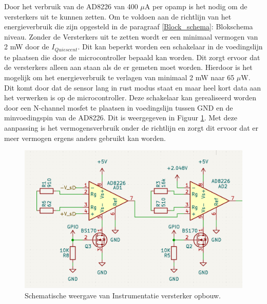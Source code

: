 Door het verbruik van de AD8226 van 400 $\mu$A per opamp is het nodig om de versterkers uit te kunnen zetten. Om te voldoen aan de richtlijn van het energieverbruik die zijn opgesteld in de paragraaf \ref{Block_schema}: Blokschema niveau. Zonder de Versterkers uit te zetten wordt er een minimaal vermogen van 2 mW door de $I_{Quiescent}$. Dit kan beperkt worden een schakelaar in de voedingslijn te plaatsen die door de microcontroller bepaald kan worden. Dit zorgt ervoor dat de versterkers alleen aan staan als de er gemeten moet worden. Hierdoor is het mogelijk om het energieverbruik te verlagen van minimaal 2 mW naar 65 $\mu$W. Dit komt door dat de sensor lang in rust modus staat en maar heel kort data aan het verwerken is op de microcontroller. Deze schakelaar kan gerealiseerd worden door een N-channel mosfet te plaatsen in voedingslijn tussen GND en de minvoedingspin van de AD8226. Dit is weergegeven in Figuur \ref{fig:Instrumentatie_amp_schematic}.
Met deze aanpassing is het vermogensverbruik onder de richtlijn en zorgt dit ervoor dat er meer vermogen ergens anders gebruikt kan worden. 
\begin{figure}[H]
    \centering
    \includegraphics[width=0.7\linewidth]{pictures/Intrumentatie_amplifier_schematic.png}
    \caption{Schematische weergave van Instrumentatie versterker opbouw.}
    \label{fig:Instrumentatie_amp_schematic}
\end{figure}

